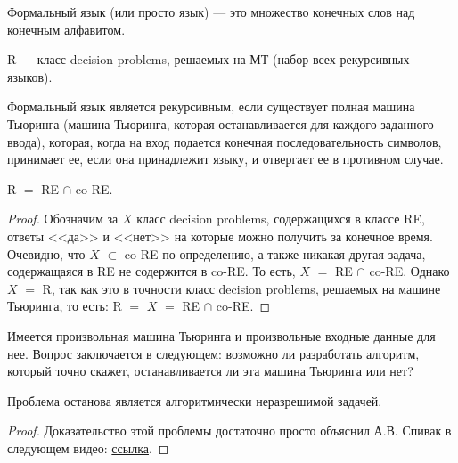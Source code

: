     \begin{Def}
        Формальный язык (или просто язык) --- это множество конечных слов над конечным алфавитом.
    \end{Def}
    
    \begin{Def}[Класс R]
        R --- класс decision problems, решаемых на МТ (набор всех рекурсивных языков). 
    \end{Def}
    
    \begin{Def} 
        Формальный язык является рекурсивным, если существует полная машина Тьюринга (машина Тьюринга, которая останавливается для каждого заданного ввода), которая, когда на вход подается конечная последовательность символов, принимает ее, если она принадлежит языку, и отвергает ее в противном случае. 
    \end{Def}
    
    \begin{Thm}
        R $=$ RE $\cap$ co-RE.
    \end{Thm}
    
    \begin{proof}
        Обозначим за $X$ класс decision problems, содержащихся в классе RE, ответы <<да>> и <<нет>> на которые можно получить за конечное время. Очевидно, что $X$ $\subset$ co-RE по определению, а также никакая другая задача, содержащаяся в RE не содержится в co-RE. То есть, $X$ $=$ RE $\cap$ co-RE. Однако $X$ $=$ R, так как это в точности класс decision problems, решаемых на машине Тьюринга, то есть: R $=$ $X$ $=$ RE $\cap$ co-RE.
    \end{proof}
    
    
    \begin{Def}
        Имеется произвольная машина Тьюринга и произвольные входные данные для нее. Вопрос заключается в следующем: возможно ли разработать алгоритм, который точно скажет, останавливается ли эта машина Тьюринга или нет?
    \end{Def}
    
    \begin{Thm}
        Проблема останова является алгоритмически неразрешимой задачей.
    \end{Thm}
    
    \begin{proof}
         Доказательство этой проблемы достаточно просто объяснил А.В. Спивак в следующем видео:
        \href{https://www.youtube.com/watch?v=JDWM6tL5oPs&ab_channel=Vanechki%3A%D0%BC%D0%B0%D1%82%D0%B5%D0%BC%D0%B0%D1%82%D0%B8%D0%BA%D0%B0%2C%D0%B1%D0%B8%D0%BE%D0%BB%D0%BE%D0%B3%D0%B8%D1%8F%D0%B8%D0%BC%D0%BD%D0%BE%D0%B3%D0%BE%D0%B5%D0%B4%D1%80%D1%83%D0%B3%D0%BE%D0%B5}{ссылка}.
    \end{proof}
    
